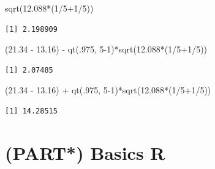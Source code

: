 \documentclass[
]{book}
\newenvironment{Shaded}{\begin{snugshade}}{\end{snugshade}}
\newcommand{\DecValTok}[1]{\textcolor[rgb]{0.00,0.00,0.81}{#1}}
\newcommand{\FloatTok}[1]{\textcolor[rgb]{0.00,0.00,0.81}{#1}}
\newcommand{\FunctionTok}[1]{\textcolor[rgb]{0.00,0.00,0.00}{#1}}
\newcommand{\NormalTok}[1]{#1}
\newcommand{\SpecialCharTok}[1]{\textcolor[rgb]{0.00,0.00,0.00}{#1}}
\begin{document}
\begin{Shaded}
\begin{Highlighting}[]
\FunctionTok{sqrt}\NormalTok{(}\FloatTok{12.088}\SpecialCharTok{*}\NormalTok{(}\DecValTok{1}\SpecialCharTok{/}\DecValTok{5}\SpecialCharTok{+}\DecValTok{1}\SpecialCharTok{/}\DecValTok{5}\NormalTok{))}
\end{Highlighting}
\end{Shaded}

\begin{verbatim}
[1] 2.198909
\end{verbatim}

\begin{Shaded}
\begin{Highlighting}[]
\NormalTok{(}\FloatTok{21.34} \SpecialCharTok{{-}} \FloatTok{13.16}\NormalTok{) }\SpecialCharTok{{-}}  \FunctionTok{qt}\NormalTok{(.}\DecValTok{975}\NormalTok{, }\DecValTok{5{-}1}\NormalTok{)}\SpecialCharTok{*}\FunctionTok{sqrt}\NormalTok{(}\FloatTok{12.088}\SpecialCharTok{*}\NormalTok{(}\DecValTok{1}\SpecialCharTok{/}\DecValTok{5}\SpecialCharTok{+}\DecValTok{1}\SpecialCharTok{/}\DecValTok{5}\NormalTok{))}
\end{Highlighting}
\end{Shaded}

\begin{verbatim}
[1] 2.07485
\end{verbatim}

\begin{Shaded}
\begin{Highlighting}[]
\NormalTok{(}\FloatTok{21.34} \SpecialCharTok{{-}} \FloatTok{13.16}\NormalTok{) }\SpecialCharTok{+}  \FunctionTok{qt}\NormalTok{(.}\DecValTok{975}\NormalTok{, }\DecValTok{5{-}1}\NormalTok{)}\SpecialCharTok{*}\FunctionTok{sqrt}\NormalTok{(}\FloatTok{12.088}\SpecialCharTok{*}\NormalTok{(}\DecValTok{1}\SpecialCharTok{/}\DecValTok{5}\SpecialCharTok{+}\DecValTok{1}\SpecialCharTok{/}\DecValTok{5}\NormalTok{))}
\end{Highlighting}
\end{Shaded}

\begin{verbatim}
[1] 14.28515
\end{verbatim}

\hypertarget{part-basics-r}{%
\chapter{(PART*) Basics R}\label{part-basics-r}}
\end{document}
